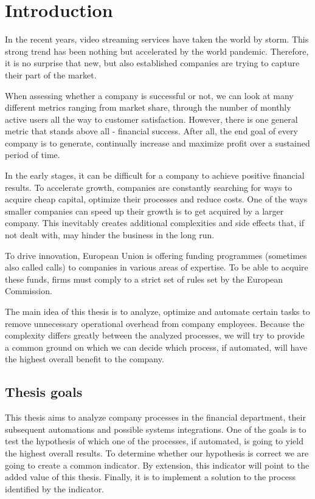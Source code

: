 \documentclass[12pt,oneside]{fithesis2}
\begin{document}
\chapter{Introduction}
In the recent years, video streaming services have taken the world by storm. This strong trend has been nothing but accelerated by the world pandemic. Therefore, it is no surprise that new, but also established companies are trying to capture their part of the market.
\par
When assessing whether a company is successful or not, we can look at many different metrics ranging from market share, through the number of monthly active users all the way to customer satisfaction. However, there is one general metric that stands above all - financial success. After all, the end goal of every company is to generate, continually increase and maximize profit over a sustained period of time.
\par
In the early stages, it can be difficult for a company to achieve positive financial results. To accelerate growth, companies are constantly searching for ways to acquire cheap capital, optimize their processes and reduce costs. One of the ways smaller companies can speed up their growth is to get acquired by a larger company. This inevitably creates additional complexities and side effects that, if not dealt with, may hinder the business in the long run.
\par
To drive innovation, European Union is offering funding programmes (sometimes also called calls) to companies in various areas of expertise. To be able to acquire these funds, firms must comply to a strict set of rules set by the European Commission.
\par
The main idea of this thesis is to analyze, optimize and automate certain tasks to remove unnecessary operational overhead from company employees. Because the complexity differs greatly between the analyzed processes, we will try to provide a common ground on which we can decide which process, if automated, will have the highest overall benefit to the company.
\newpage
\section{Thesis goals}
This thesis aims to analyze company processes in the financial department, their subsequent automations and possible systems integrations. One of the goals is to test the hypothesis of which one of the processes, if automated, is going to yield the highest overall results. To determine whether our hypothesis is correct we are going to create a common indicator. By extension, this indicator will point to the added value of this thesis. Finally, it is to implement a solution to the process identified by the indicator.
\end{document}

